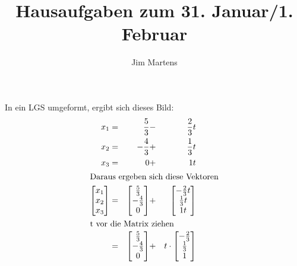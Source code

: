 \documentclass[10pt,a4paper,oneside,ngerman,numbers=noenddot]{scrartcl}
\begin{document}
\author{Jim Martens}
\title{Hausaufgaben zum 31. Januar/1. Februar}
\maketitle
\section{} %
\subsection{} %
In ein LGS umgeformt, ergibt sich dieses Bild:\\
\begin{alignat*}{3}
x_{1} &=& \frac{5}{3} &-& \frac{2}{3}t \\
x_{2} &=& - \frac{4}{3} &+& \frac{1}{3}t \\
x_{3} &=& 0 &+& 1t \\
\intertext{Daraus ergeben sich diese Vektoren}
\begin{bmatrix}
x_{1} \\
x_{2} \\
x_{3}
\end{bmatrix} &=& 
\begin{bmatrix}
\frac{5}{3} \\
-\frac{4}{3} \\
0
\end{bmatrix} &+&
\begin{bmatrix}
-\frac{2}{3}t \\
\frac{1}{3}t \\
1t
\end{bmatrix} \\
\intertext{t vor die Matrix ziehen}
&=& \begin{bmatrix}
\frac{5}{3} \\
-\frac{4}{3} \\
0
\end{bmatrix} &+& t \cdot 
\begin{bmatrix}
-\frac{2}{3} \\
\frac{1}{3} \\
1
\end{bmatrix}
\end{alignat*}
\end{document}
